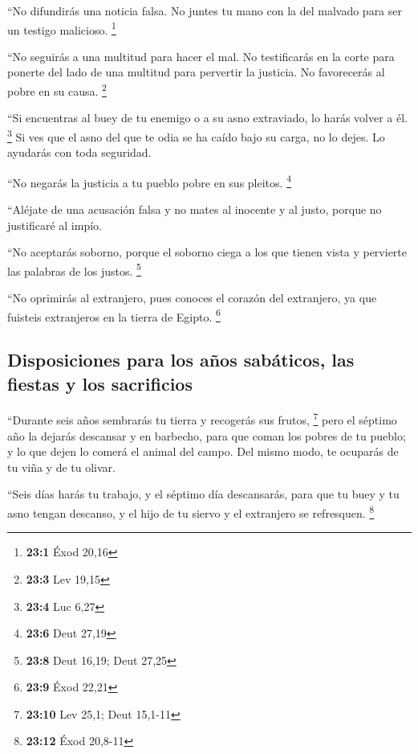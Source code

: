\begin{paracol}{2}
 ``No difundirás una noticia falsa. No juntes tu mano con
la del malvado para ser un testigo malicioso. \footnote{\textbf{23:1}
  Éxod 20,16}

 ``No seguirás a una multitud para hacer el mal. No
testificarás en la corte para ponerte del lado de una multitud para
pervertir la justicia.  No favorecerás al pobre en su
causa. \footnote{\textbf{23:3} Lev 19,15}

 ``Si encuentras al buey de tu enemigo o a su asno
extraviado, lo harás volver a él. \footnote{\textbf{23:4} Luc 6,27}
 Si ves que el asno del que te odia se ha caído bajo su
carga, no lo dejes. Lo ayudarás con toda seguridad.

 ``No negarás la justicia a tu pueblo pobre en sus
pleitos. \footnote{\textbf{23:6} Deut 27,19}

 ``Aléjate de una acusación falsa y no mates al inocente y
al justo, porque no justificaré al impío.

 ``No aceptarás soborno, porque el soborno ciega a los que
tienen vista y pervierte las palabras de los justos. \footnote{\textbf{23:8}
  Deut 16,19; Deut 27,25}

 ``No oprimirás al extranjero, pues conoces el corazón del
extranjero, ya que fuisteis extranjeros en la tierra de Egipto.
\footnote{\textbf{23:9} Éxod 22,21}

\hypertarget{disposiciones-para-los-auxf1os-sabuxe1ticos-las-fiestas-y-los-sacrificios}{%
\subsection{Disposiciones para los años sabáticos, las fiestas y los
sacrificios}\label{disposiciones-para-los-auxf1os-sabuxe1ticos-las-fiestas-y-los-sacrificios}}

 ``Durante seis años sembrarás tu tierra y recogerás sus
frutos, \footnote{\textbf{23:10} Lev 25,1; Deut 15,1-11} 
pero el séptimo año la dejarás descansar y en barbecho, para que coman
los pobres de tu pueblo; y lo que dejen lo comerá el animal del campo.
Del mismo modo, te ocuparás de tu viña y de tu olivar.

 ``Seis días harás tu trabajo, y el séptimo día
descansarás, para que tu buey y tu asno tengan descanso, y el hijo de tu
siervo y el extranjero se refresquen. \footnote{\textbf{23:12} Éxod
  20,8-11}


\end{paracol}
